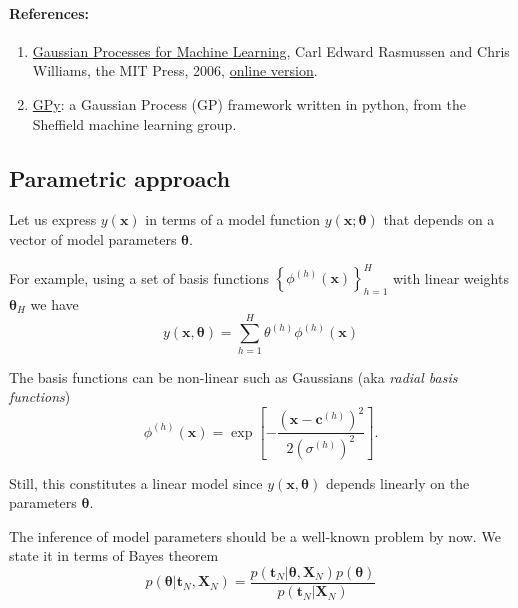 \documentclass[%
oneside,                 %
final,                   %
10pt]{article}
\newenvironment{notice_mdfboxadmon}[1][]{
\begin{notice_mdfboxmdframed}[frametitle=#1]
}
{
\end{notice_mdfboxmdframed}
}
\begin{document}
\paragraph{References:}
\begin{enumerate}
\item \href{{http://www.gaussianprocess.org/gpml}}{Gaussian Processes for Machine Learning}, Carl Edward Rasmussen and Chris Williams, the MIT Press, 2006, \href{{http://www.gaussianprocess.org/gpml/chapters}}{online version}.

\item \href{{https://sheffieldml.github.io/GPy/}}{GPy}: a Gaussian Process (GP) framework written in python, from the Sheffield machine learning group.
\end{enumerate}

\noindent
\subsection{Parametric approach}

Let us express $y(\boldsymbol{x})$ in terms of a model function $y(\boldsymbol{x}; \boldsymbol{\theta})$ that depends on a vector of model parameters $\boldsymbol{\theta}$.

For example, using a set of basis functions $\left\{ \phi^{(h)} (\boldsymbol{x}) \right\}_{h=1}^H$ with linear weights $\boldsymbol{\theta}_H$ we have
\[
y (\boldsymbol{x}, \boldsymbol{\theta}) = \sum_{h=1}^H \theta^{(h)} \phi^{(h)} (\boldsymbol{x})
\]


\begin{notice_mdfboxadmon}[Notice]
The basis functions can be non-linear such as Gaussians (aka \emph{radial basis functions})
\[
\phi^{(h)} (\boldsymbol{x}) = \exp \left[ -\frac{\left( \boldsymbol{x} - \boldsymbol{c}^{(h)} \right)^2}{2 (\sigma^{(h)})^2} \right].
\]

Still, this constitutes a linear model since $y (\boldsymbol{x}, \boldsymbol{\theta})$ depends linearly on the parameters $\boldsymbol{\theta}$.
\end{notice_mdfboxadmon} %



The inference of model parameters should be a well-known problem by now. We state it in terms of Bayes theorem
\[
p \left( \boldsymbol{\theta} | \boldsymbol{t}_N, \boldsymbol{X}_N \right)
= \frac{ p \left( \boldsymbol{t}_N | \boldsymbol{\theta}, \boldsymbol{X}_N \right) p \left( \boldsymbol{\theta} \right)}{p \left( \boldsymbol{t}_N | \boldsymbol{X}_N \right)}
\]
\end{document}
